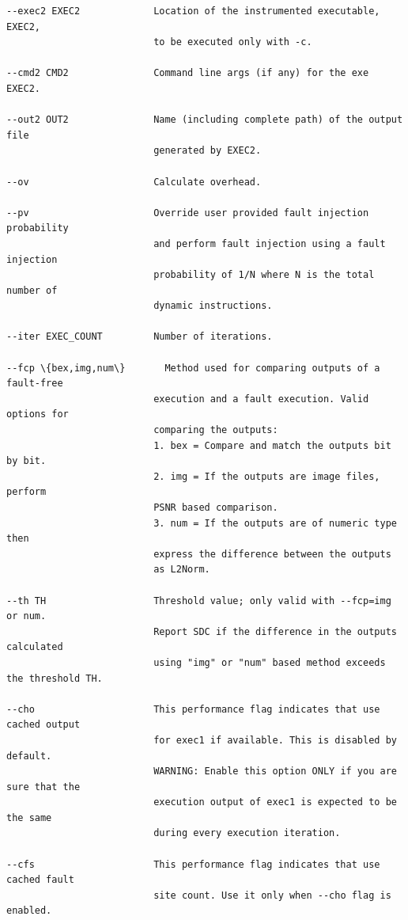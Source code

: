 \documentclass[12pt,a4paper]{article}
\begin{document}
\begin{Verbatim}[fontsize=\relsize{-1},frame=single,framerule=0.1mm,commandchars=\\\{\}]
--exec2 EXEC2             Location of the instrumented executable, EXEC2, 
                          to be executed only with -c.
                          
--cmd2 CMD2               Command line args (if any) for the exe EXEC2.
					  
--out2 OUT2               Name (including complete path) of the output file 
                          generated by EXEC2.
                          
--ov                      Calculate overhead.

--pv                      Override user provided fault injection probability 
                          and perform fault injection using a fault injection 
                          probability of 1/N where N is the total number of 
                          dynamic instructions.

--iter EXEC_COUNT         Number of iterations.

--fcp \{bex,img,num\}       Method used for comparing outputs of a fault-free 
                          execution and a fault execution. Valid options for 
                          comparing the outputs:
                          1. bex = Compare and match the outputs bit by bit.
                          2. img = If the outputs are image files, perform 
                          PSNR based comparison.
                          3. num = If the outputs are of numeric type then 
                          express the difference between the outputs
                          as L2Norm.

--th TH                   Threshold value; only valid with --fcp=img or num.
                          Report SDC if the difference in the outputs calculated 
                          using "img" or "num" based method exceeds the threshold TH.
                          
--cho                     This performance flag indicates that use cached output 
                          for exec1 if available. This is disabled by default.
                          WARNING: Enable this option ONLY if you are sure that the 
                          execution output of exec1 is expected to be the same 
                          during every execution iteration.
                          
--cfs                     This performance flag indicates that use cached fault 
                          site count. Use it only when --cho flag is enabled.


\end{Verbatim}
\end{document}
